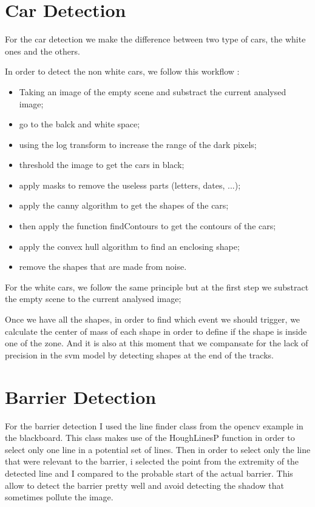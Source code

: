 \documentclass{report}
\begin{document}
\section{Car Detection}
For the car detection we make the difference between two type of cars, the white ones and the others.

In order to detect the non white cars, we follow this workflow :
\begin{itemize}
  \item Taking an image of the empty scene and substract the current analysed image;
  \item go to the balck and white space;
  \item using the log transform to increase the range of the dark pixels;
  \item threshold the image to get the cars in black;
  \item apply masks to remove the useless parts (letters, dates, ...);
  \item apply the canny algorithm to get the shapes of the cars;
  \item then apply the function findContours to get the contours of the cars;
  \item apply the convex hull algorithm to find an enclosing shape;
  \item remove the shapes that are made from noise.
\end{itemize}

For the white cars, we follow the same principle but at the first step we substract the empty scene to the current analysed image;

Once we have all the shapes, in order to find which event we should trigger, we calculate the center of mass of each shape in order to define if the shape is inside one of the zone. And it is also at this moment that we compansate for the lack of precision in the svm model by detecting shapes at the end of the tracks.



\section{Barrier Detection}

For the barrier detection I used the line finder class from the opencv example in the blackboard. This class makes use of the HoughLinesP function in order to select only one line in a potential set of lines. Then in order to select only the line that were relevant to the barrier, i selected the point from the extremity of the detected line and I compared to the probable start of the actual barrier.
This allow to detect the barrier pretty well and avoid detecting the shadow that sometimes pollute the image.
\end{document}
